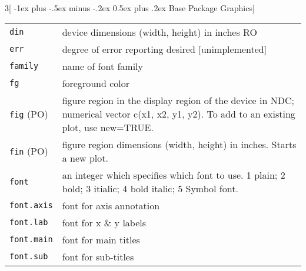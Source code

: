 \documentclass[landscape]{article}
\makeatletter
\renewcommand{\section}{\@startsection{section}{1}{0mm}%
                                {-1ex plus -.5ex minus -.2ex}%
                                {0.5ex plus .2ex}%
                                {\normalfont\large\bfseries}}
\makeatother
\begin{document}
\begin{multicols}{3}[\section{Base Package Graphics}]
\begin{tabular}[t]{@{}p{\widthleftcol}p{\widthrightcol}@{}}
\verb|din| & device dimensions (width, height) in inches RO \\
\verb|err| & degree of error reporting desired [unimplemented] \\
\verb|family| & name of font family \\
\verb|fg| & foreground color \\
\verb|fig| (PO) & figure region in the display region of the device in NDC; numerical vector c(x1, x2, y1, y2). To add to an existing plot, use new=TRUE. \\
\verb|fin| (PO) & figure region dimensions (width, height) in inches. Starts a new plot. \\
\verb|font| & an integer which specifies which font to use. 1 plain; 2 bold; 3 itialic; 4 bold italic; 5 Symbol font. \\
\verb|font.axis| & font for axis annotation \\
\verb|font.lab| & font for x \& y labels \\
\verb|font.main| & font for main titles \\
\verb|font.sub| & font for sub-titles \\
\hline
\end{tabular}


\end{multicols}
\end{document}
